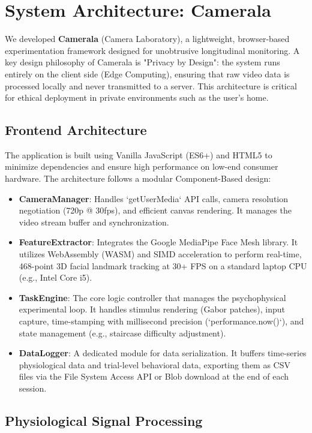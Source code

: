 \section{System Architecture: Camerala}

We developed \textbf{Camerala} (Camera Laboratory), a lightweight, browser-based experimentation framework designed for unobtrusive longitudinal monitoring. A key design philosophy of Camerala is "Privacy by Design": the system runs entirely on the client side (Edge Computing), ensuring that raw video data is processed locally and never transmitted to a server. This architecture is critical for ethical deployment in private environments such as the user's home.

\subsection{Frontend Architecture}
The application is built using Vanilla JavaScript (ES6+) and HTML5 to minimize dependencies and ensure high performance on low-end consumer hardware. The architecture follows a modular Component-Based design:

\begin{itemize}
    \item \textbf{CameraManager}: Handles `getUserMedia` API calls, camera resolution negotiation (720p @ 30fps), and efficient canvas rendering. It manages the video stream buffer and synchronization.
    \item \textbf{FeatureExtractor}: Integrates the Google MediaPipe Face Mesh \cite{mediapipe} library. It utilizes WebAssembly (WASM) and SIMD acceleration to perform real-time, 468-point 3D facial landmark tracking at 30+ FPS on a standard laptop CPU (e.g., Intel Core i5).
    \item \textbf{TaskEngine}: The core logic controller that manages the psychophysical experimental loop. It handles stimulus rendering (Gabor patches), input capture, time-stamping with millisecond precision (`performance.now()`), and state management (e.g., staircase difficulty adjustment).
    \item \textbf{DataLogger}: A dedicated module for data serialization. It buffers time-series physiological data and trial-level behavioral data, exporting them as CSV files via the File System Access API or Blob download at the end of each session.
\end{itemize}

\subsection{Physiological Signal Processing}

